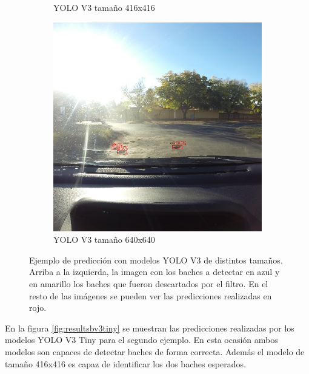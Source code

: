 \begin{figure}[H]
\begin{subfigure}[h]{0.45\linewidth}
		\caption{YOLO V3 tamaño 416x416}
	\end{subfigure}
	\begin{subfigure}[h]{0.45\linewidth}
		\includegraphics[width=\linewidth]{images/results_b_yolo_v3_640.jpg}
		\caption{YOLO V3 tamaño 640x640}
	\end{subfigure}
	\caption{Ejemplo de predicción con modelos YOLO V3 de distintos tamaños. Arriba a la izquierda, la imagen con los baches a detectar en azul y en amarillo los baches que fueron descartados por el filtro. En el resto de las imágenes se pueden ver las predicciones realizadas en rojo.}
	\label{fig:resultsbv3}
\end{figure}

En la figura \ref{fig:resultsbv3tiny} se muestran las predicciones realizadas por los modelos YOLO V3 Tiny para el segundo ejemplo. En esta ocasión ambos modelos son capaces de detectar baches de forma correcta. Además el modelo de tamaño 416x416 es capaz de identificar los dos baches esperados.

